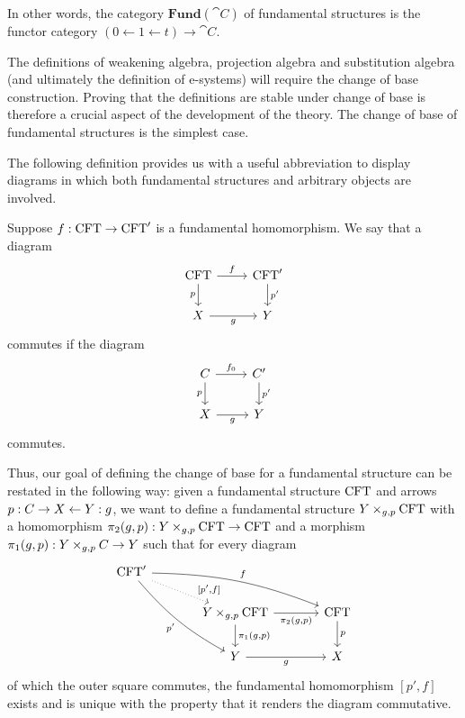 In other words, the category $\mathbf{Fund}(\cat{C})$ of fundamental structures
is the functor category $(0\leftarrow 1\leftarrow t)\to\cat{C}$. 

The definitions of weakening algebra, projection algebra and substitution
algebra (and ultimately the definition of e-systems) will require the
change of base construction. Proving that the definitions are stable under
change of base is therefore a crucial aspect of the development of the theory.
The change of base of fundamental structures is the simplest case.

The following definition provides us with a useful abbreviation to display
diagrams in which both fundamental structures and arbitrary objects are 
involved.

\begin{defn}
Suppose $f:\mathrm{CFT}\to\mathrm{CFT}'$ is a fundamental homomorphism. We say that
a diagram
\begin{equation*}
\begin{tikzcd}
\stesys
  \ar{r}{f}
  \ar{d}[swap]{p}
  &
\stesys'
  \ar{d}{p'}
  \\
X \ar{r}[swap]{g}
  &
Y
\end{tikzcd}
\end{equation*}
commutes if the diagram
\begin{equation*}
\begin{tikzcd}
\stesysc
  \ar{r}{f_0}
  \ar{d}[swap]{p}
  &
\stesysc'
  \ar{d}{p'}
  \\
X \ar{r}[swap]{g}
  &
Y
\end{tikzcd}
\end{equation*}
commutes.
\end{defn}

Thus, our goal of defining the change of base for a fundamental structure
can be restated in the following way: given a fundamental structure 
$\mathrm{CFT}$ and arrows $p:C\rightarrow X\leftarrow Y:g$, we want to
define a fundamental structure $\cobesys{Y}{\stesys}{g}{p}$ with a 
homomorphism $\pullbackpr{2}{g}{p}: \cobesys{Y}{\stesys}{g}{p}\to\stesys$ and a 
morphism $\pullbackpr{1}{g}{p}: \pullback{Y}{\stesysc}{g}{p}\to Y$ such that for
every diagram
\begin{equation*}
\begin{tikzcd}[column sep=large]
\stesys'
  \ar[bend right=10]{ddr}[swap]{p'}
  \ar[bend left=10]{rrd}{f}
  \ar[dotted]{dr}[near end]{[p',f]}
  \\
  {}&
\cobesys{Y}{\stesys}{g}{p}
  \ar{d}{\pullbackpr{1}{g}{p}}
  \ar{r}[swap]{\pullbackpr{2}{g}{p}}
  &
\stesys
  \ar{d}{p}
  \\
  {}&
Y \ar{r}[swap]{g}
  &
X
\end{tikzcd}
\end{equation*}
of which the outer square commutes, the fundamental homomorphism $[p',f]$ 
exists and is unique with the property that it renders the diagram commutative.

